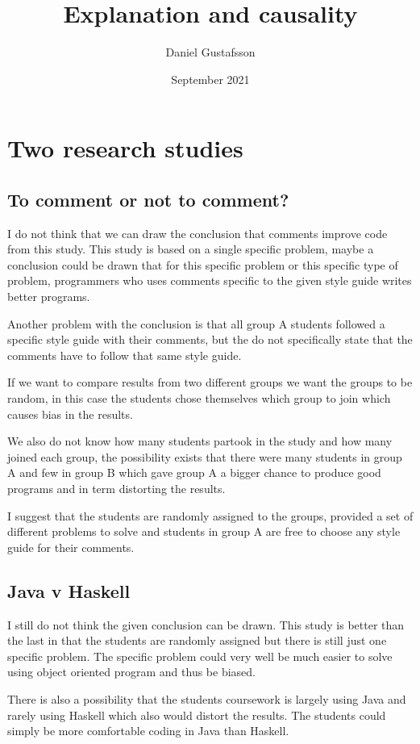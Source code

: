 \documentclass[11pt, a4paper]{article}
\title{Explanation and causality}
\author{Daniel Gustafsson}
\date{September 2021}
\begin{document}
\maketitle

\section{Two research studies}

\subsection{To comment or not to comment?}
I do not think that we can draw the conclusion that comments improve code from this study.
This study is based on a single specific problem, maybe a conclusion could be drawn that for this specific problem
or this specific type of problem, programmers who uses comments specific to the given style guide writes better programs.

Another problem with the conclusion is that all group A students followed a specific style guide with their comments,
but the do not specifically state that the comments have to follow that same style guide.

If we want to compare results from two different groups we want the groups to be random, in this case the students
chose themselves which group to join which causes bias in the results.

We also do not know how many students partook in the study and how many joined each group, the possibility exists that
there were many students in group A and few in group B which gave group A a bigger chance to produce good programs and
in term distorting the results.

I suggest that the students are randomly assigned to the groups, provided a set of different problems to solve and students in
group A are free to choose any style guide for their comments.

\subsection{Java v Haskell}
I still do not think the given conclusion can be drawn. This study is better than the last in that the students are randomly
assigned but there is still just one specific problem. The specific problem could very well be much easier to solve using
object oriented program and thus be biased.

There is also a possibility that the students coursework is largely using Java and rarely using Haskell which also would
distort the results. The students could simply be more comfortable coding in Java than Haskell.
\end{document}
